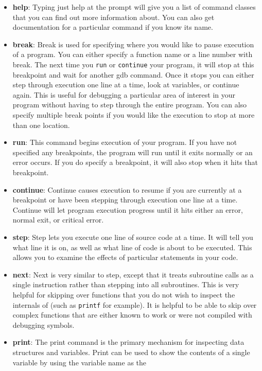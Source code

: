 \documentclass[11pt, letterpaper]{article}
\begin{document}
\begin{itemize}
\item \textbf{help}: Typing just help at the prompt will give you a list
of command classes that you can find out more information about.  You
can also get documentation for a particular command if you know its
name.
\item \textbf{break}: Break is used for specifying where you would like
to pause execution of a program.  You can either specify a function name
or a line number with break.  The next time you {\tt run} or {\tt continue} your
program, it will stop at this breakpoint and wait for another gdb
command.  Once it stops you can either step through execution one line
at a time, look at variables, or continue again.  This is useful for
debugging a particular area of interest in your program without having
to step through the entire program.  You can also specify multiple break
points if you would like the execution to stop at more than one
location.
\item \textbf{run}:  This command begins execution of your program.  If
you have not specified any breakpoints, the program will run until it
exits normally or an error occurs.  If you do specify a breakpoint, it
will also stop when it hits that breakpoint.
\item \textbf{continue}:  Continue causes execution to resume if you are
currently at a breakpoint or have been stepping through execution one
line at a time.  Continue will let program execution progress until it
hits either an error, normal exit, or critical error.
\item \textbf{step}:  Step lets you execute one line of source code at a
time.  It will tell you what line it is on, as well as what line of code
is about to be executed.  This allows you to examine the effects of
particular statements in your code.
\item \textbf{next}:  Next is very similar to step, except that it
treats subroutine calls as a single instruction rather than stepping
into all subroutines.  This is very helpful for skipping over functions
that you do not wish to inspect the internals of (such as {\tt printf}
for example).  It is helpful to be able to skip over complex functions
that are either known to work or were not compiled with debugging
symbols.
\item \textbf{print}:  The print command is the primary mechanism for
inspecting data structures and variables.  Print can be used to show the
contents of a single variable by using the variable name as the

\end{itemize}
\end{document}
